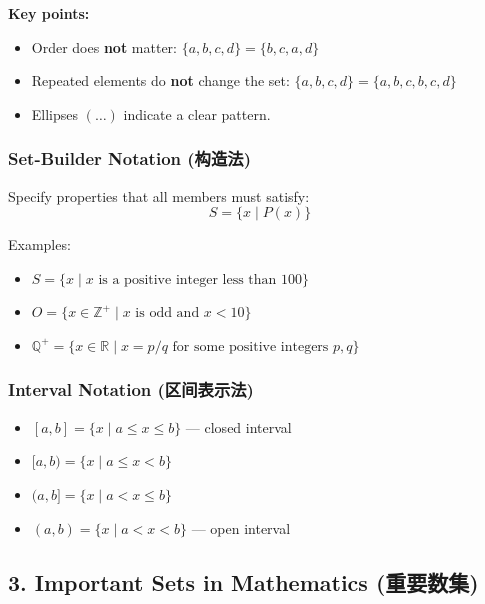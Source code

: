 \documentclass[10pt,a4paper,openany]{ctexbook}
\theoremstyle{definition}
\theoremstyle{remark}
\begin{document}
\textbf{Key points:}
\begin{itemize}
\item Order does \textbf{not} matter: $\{a,b,c,d\} = \{b,c,a,d\}$
\item Repeated elements do \textbf{not} change the set: $\{a,b,c,d\} = \{a,b,c,b,c,d\}$
\item Ellipses $(\dots)$ indicate a clear pattern.

\end{itemize}

\subsubsection{Set-Builder Notation (构造法)}

Specify properties that all members must satisfy:
\[
S = \{x \mid P(x)\}
\]

Examples:
\begin{itemize}
\item $S = \{x \mid x \text{ is a positive integer less than } 100\}$
\item $O = \{x \in \mathbb{Z}^+ \mid x \text{ is odd and } x < 10\}$
\item $\mathbb{Q}^+ = \{x \in \mathbb{R} \mid x = p/q \text{ for some positive integers } p, q\}$

\end{itemize}

\subsubsection{Interval Notation (区间表示法)}

\begin{itemize}
\item $[a,b] = \{x \mid a \le x \le b\}$ — closed interval
\item $[a,b) = \{x \mid a \le x < b\}$
\item $(a,b] = \{x \mid a < x \le b\}$
\item $(a,b) = \{x \mid a < x < b\}$ — open interval

\end{itemize}

\vspace{-2pt}

\subsection{3. Important Sets in Mathematics (重要数集)}
\end{document}
